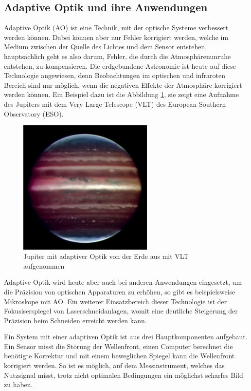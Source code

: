 \begin{refsection}
\section{Adaptive Optik und ihre Anwendungen}
Adaptive Optik (AO) ist eine Technik, mit der optische Systeme
verbessert werden können. Dabei können aber nur Fehler korrigiert
werden, welche im Medium zwischen der Quelle des Lichtes und dem Sensor
entstehen, hauptsächlich geht es also darum, Fehler, die durch die
Atmosphärenunruhe entstehen, zu kompensieren. Die erdgebundene Astronomie
ist heute auf diese Technologie angewiesen, denn Beobachtungen im
optischen und infraroten Bereich sind nur möglich, wenn die negativen
Effekte der Atmosphäre korrigiert werden können. Ein Beispiel dazu ist
die Abbildung \ref{fig:jupiter}, sie zeigt eine Aufnahme des Jupiters mit
dem Very Large Telescope (VLT) des European Southern Observatory (ESO).
%
%
\begin{figure}
  \centering
  \includegraphics[width=0.6\textwidth]{adaptiv/images/Jupiter_adaptiv}
  \caption{Jupiter mit adaptiver Optik von der Erde aus mit VLT aufgenommen
    \cite{eso:jupiter}}
  \label{fig:jupiter}
\end{figure}

Adaptive Optik wird heute aber auch bei anderen Anwendungen eingesetzt,
um die Präzision von optischen Apparaturen zu erhöhen, so gibt es
beispielsweise Mikroskope mit AO. Ein weiterer Einsatzbereich dieser
Technologie ist der Fokusiserspiegel von Laserschneidanlagen, womit eine
deutliche Steigerung der Präzision beim Schneiden erreicht werden kann.
%
%

Ein System mit einer adaptiven Optik ist aus drei Hauptkomponenten
aufgebaut. Ein Sensor misst die Störung der Wellenfront, einen Computer
berechnet die benötigte Korrektur und mit einem beweglichen Spiegel
kann die Wellenfront korrigiert werden. So ist es möglich, auf dem
Messinstrument, welches das Nutzsignal misst, trotz nicht optimalen
Bedingungen ein möglichst scharfes Bild zu haben.


\end{refsection}
